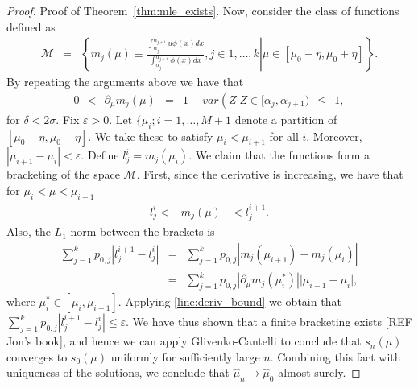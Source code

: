 \documentclass[12pt]{article} %
\newcommand{\eps}{\varepsilon}
\begin{document}
\begin{proof}{Proof of Theorem~\ref{thm:mle_exists}.}
Now, consider the class of functions defined as 
\begin{eqnarray*}
\mathcal M &=&\left\{\left. m_j(\mu) \equiv \frac{\int_{\alpha_j}^{\alpha_{j+1}}  u \phi(x)dx}{  \int_{\alpha_j}^{\alpha_{j+1}}  \phi(x)dx}, j\in 1, \ldots, k \right\vert \mu \in [\mu_0-\eta, \mu_0+\eta]\right\}.
\end{eqnarray*}
By repeating the arguments above we have that 
\begin{eqnarray}\label{line:deriv_bound}
0\ \ < \ \ \partial_\mu m_j(\mu) &=& 1-var\left(Z\vert Z \in [\alpha_{j},\alpha_{j+1}) \ \ \leq \ \ 1,
\end{eqnarray}
for $\delta<2\sigma.$
Fix $\eps>0.$  Let $\{\mu_i; i=1, \ldots, M+1$ denote a partition of $[\mu_0-\eta, \mu_0+\eta].$  We take these to satisfy $\mu_i < \mu_{i+1}$ for all $i.$  Moreover, $|\mu_{i+1}-\mu_i| < \eps.$
Define $l_j^i= m_j(\mu_i).$   We claim that the functions form a bracketing of the space $\mathcal M.$  First, since the derivative is increasing, we have that for $\mu_i < \mu < \mu_{i+1}$
\begin{eqnarray*}
l_j^i < &m_j(\mu)& < l_j^{i+1}.
\end{eqnarray*}
Also, the $L_1$ norm between the brackets is 
\begin{eqnarray*}
\sum_{j=1}^k p_{0,j} \left\vert l_j^{i+1}-l_j^{i} \right \vert &= & \sum_{j=1}^k p_{0,j} \left\vert  m_j(\mu_{i+1})- m_j(\mu_i) \right \vert \\
&= & \sum_{j=1}^k p_{0,j} \left\vert  \partial_\mu m_j(\mu^*_{i})\right \vert \vert \mu_{i+1} -\mu_i\vert,
\end{eqnarray*}
where $\mu^*_i \in [\mu_i,\mu_{i+1}].$   Applying \eqref{line:deriv_bound} we obtain that $\sum_{j=1}^k p_{0,j} \left\vert l_j^{i+1}-l_j^{i} \right \vert \leq \eps.$
We have thus shown that a finite bracketing exists [REF Jon's book], and hence we can apply Glivenko-Cantelli to conclude that $s_n(\mu)$ converges to $s_0(\mu)$ uniformly for sufficiently large $n.$  Combining this fact with uniqueness of the solutions, we conclude that $\widehat \mu_n \rightarrow \widehat \mu_0$ almost surely.
\end{proof}

\bigskip
\end{document}
